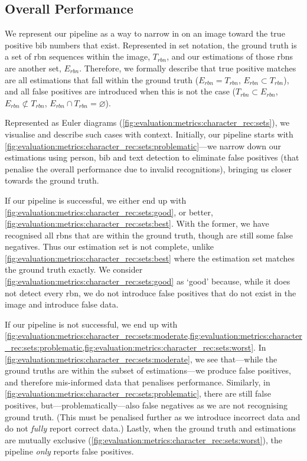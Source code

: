 \subsection{Overall Performance}
\label{sec:evaluation:metrics:overall}

We represent our pipeline as a way to narrow in on an image toward the true positive bib numbers that exist. Represented in set notation, the ground truth is a set of \gls{rbn} sequences within the image, $T_{rbn}$, and our estimations of those \glspl{rbn} are another set, $E_{rbn}$. Therefore, we formally describe that true positive matches are all estimations that fall within the ground truth ($E_{rbn} = T_{rbn}$, $E_{rbn} \subset T_{rbn}$), and all false positives are introduced when this is not the case ($T_{rbn} \subset E_{rbn}$, $E_{rbn} \not\subset T_{rbn}$,  $E_{rbn} \cap T_{rbn} = \varnothing$).

Represented as Euler diagrams (\cref{fig:evaluation:metrics:character_rec:sets}), we visualise and describe such cases with context. Initially, our pipeline starts with \cref{fig:evaluation:metrics:character_rec:sets:problematic}---we narrow down our estimations using person, bib and text detection to eliminate false positives (that penalise the overall performance due to invalid recognitions), bringing us closer towards the ground truth.

If our pipeline is successful, we either end up with \cref{fig:evaluation:metrics:character_rec:sets:good}, or better, \cref{fig:evaluation:metrics:character_rec:sets:best}. With the former, we have recognised all \glspl{rbn} that are within the ground truth, though are still some false negatives. Thus our estimation set is not complete, unlike \cref{fig:evaluation:metrics:character_rec:sets:best} where the estimation set matches the ground truth exactly. We consider \cref{fig:evaluation:metrics:character_rec:sets:good} as `good' because, while it does not detect every \gls{rbn}, we do not introduce false positives that do not exist in the image and introduce false data.

If our pipeline is not successful, we end up with \cref{fig:evaluation:metrics:character_rec:sets:moderate,fig:evaluation:metrics:character_rec:sets:problematic,fig:evaluation:metrics:character_rec:sets:worst}. In  \cref{fig:evaluation:metrics:character_rec:sets:moderate}, we see that---while the ground truths are within the subset of estimations---we produce false positives, and therefore mis-informed data that penalises performance. Similarly, in \cref{fig:evaluation:metrics:character_rec:sets:problematic}, there are still false positives, but---problematically---also false negatives as we are not recognising ground truth. (This must be penalised further as we introduce incorrect data and do not \textit{fully} report correct data.) Lastly, when the ground truth and estimations are mutually exclusive (\cref{fig:evaluation:metrics:character_rec:sets:worst}), the pipeline \textit{only} reports false positives.

